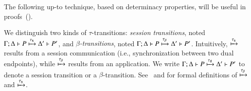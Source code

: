 \documentclass[preprint,11pt]{elsarticle}
\newtheorem{definition}{Definition}[section]
\begin{document}
{%
%


The following up-to technique, based on determinacy properties, will be useful in proofs~().

 
 \begin{notation}
 \label{not:dettrans}
We distinguish two kinds of  $\tau$-transitions:
\emph{session transitions}, noted 
$\Gamma; \Delta \vdash P \xmapsto{\tau_{\mathsf{s}}} \Delta' \vdash P'$,
and 
\emph{$\beta$-transitions}, noted $\Gamma; \Delta \vdash P \xmapsto{\tau_{\beta}} \Delta' \vdash P'$.
Intuitively, $\xmapsto{\tau_{\mathsf{s}}}$  results from a session communication (i.e., synchronization between
two dual endpoints), while 
  $\xmapsto{\tau_{\beta}}$ results from an application. 
 We write  $\Gamma; \Delta \vdash P \xmapsto{\tau_{\mathsf{d}}} \Delta' \vdash P'$ to denote
	 a session transition or a $\beta$-transition.
	See~ and \cite{KouzapasPY17} for formal definitions of $\xmapsto{\tau_{\beta}}$  and $\xmapsto{\tau_{\mathsf{s}}}$. %
 \end{notation}
 
}
\end{document}
